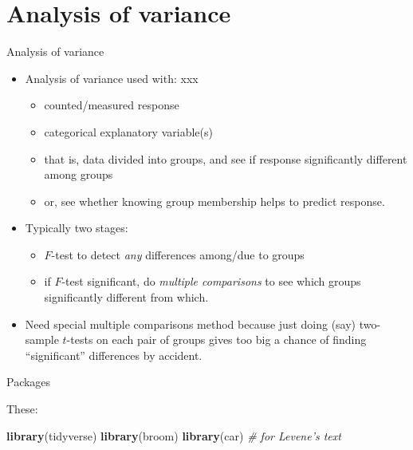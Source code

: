 \documentclass[ignorenonframetext,]{beamer}
\newenvironment{Shaded}{\begin{snugshade}}{\end{snugshade}}
\newcommand{\CommentTok}[1]{\textcolor[rgb]{0.56,0.35,0.01}{\textit{#1}}}
\newcommand{\KeywordTok}[1]{\textcolor[rgb]{0.13,0.29,0.53}{\textbf{#1}}}
\newcommand{\NormalTok}[1]{#1}
\begin{document}
\hypertarget{analysis-of-variance}{%
\section{Analysis of variance}\label{analysis-of-variance}}

\begin{frame}{Analysis of variance}
\protect\hypertarget{analysis-of-variance-1}{}

\begin{itemize}
\item
  Analysis of variance used with: xxx

  \begin{itemize}
  \item
    counted/measured response
  \item
    categorical explanatory variable(s)
  \item
    that is, data divided into groups, and see if response significantly
    different among groups
  \item
    or, see whether knowing group membership helps to predict response.
  \end{itemize}
\item
  Typically two stages:

  \begin{itemize}
  \item
    \(F\)-test to detect \emph{any} differences among/due to groups
  \item
    if \(F\)-test significant, do \emph{multiple comparisons} to see
    which groups significantly different from which.
  \end{itemize}
\item
  Need special multiple comparisons method because just doing (say)
  two-sample \(t\)-tests on each pair of groups gives too big a chance
  of finding ``significant'' differences by accident.
\end{itemize}

\end{frame}

\begin{frame}[fragile]{Packages}
\protect\hypertarget{packages-2}{}

These:

\begin{Shaded}
\begin{Highlighting}[]
\KeywordTok{library}\NormalTok{(tidyverse)}
\KeywordTok{library}\NormalTok{(broom)}
\KeywordTok{library}\NormalTok{(car) }\CommentTok{# for Levene's text}
\end{Highlighting}
\end{Shaded}

\end{frame}
\end{document}
